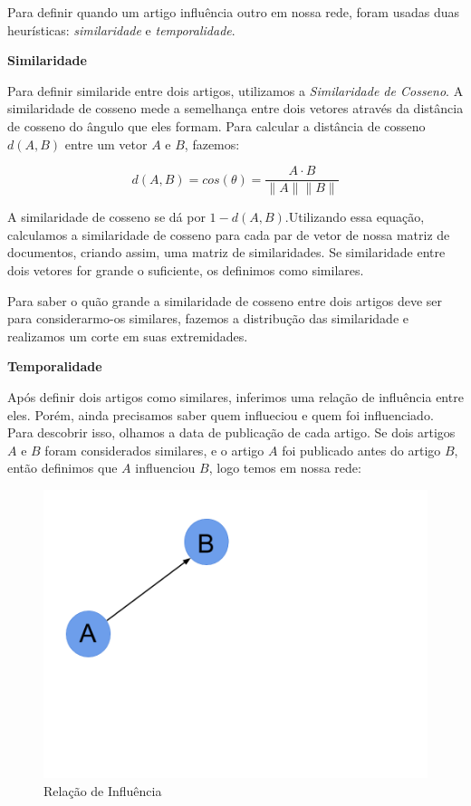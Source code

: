 \documentclass[a4paper,12pt]{article}
\begin{document}
 Para definir quando um artigo influência outro em nossa rede, foram usadas duas heurísticas: \textit{similaridade} e 
 \textit{temporalidade}.
 
 \begin{description}
  \item \textbf{Similaridade}
  
    Para definir similaride entre dois artigos, utilizamos a \textit{Similaridade de Cosseno}. A similaridade de cosseno mede a semelhança entre
    dois vetores através da distância de cosseno do ângulo que eles formam. Para calcular a distância de cosseno $d(A,B)$ entre um vetor $A$ e $B$, fazemos:
    
    $$ d(A,B) = cos(\theta) = \dfrac{A \cdot B}{\parallel A\parallel \parallel B \parallel} $$
    
    A similaridade de cosseno se dá por $1-d(A,B)$.Utilizando essa equação, calculamos a similaridade de cosseno para cada
    par de vetor de nossa matriz de documentos, criando assim, uma matriz de similaridades. Se similaridade entre dois vetores for 
    grande o suficiente, os definimos como similares. 
    
    Para saber o quão grande a similaridade de cosseno entre dois artigos deve ser para considerarmo-os similares, fazemos a
    distribução das similaridade e realizamos um corte em suas extremidades.
    
    
  \item \textbf{Temporalidade}
  
    Após definir dois artigos como similares, inferimos uma relação de influência entre eles. Porém, ainda precisamos saber quem influeciou e quem
    foi influenciado. Para descobrir isso, olhamos a data de publicação de cada artigo. Se dois artigos $A$ e $B$ foram considerados 
    similares, e o artigo $A$ foi publicado antes do artigo $B$, então definimos que $A$ influenciou $B$, logo temos em nossa rede:
    
    \begin{figure}[h]
      \centering
      \includegraphics[scale=0.2]{./rede2.png}
      \caption{Relação de Influência}
    \end{figure}
    

\end{description}
\end{document}
